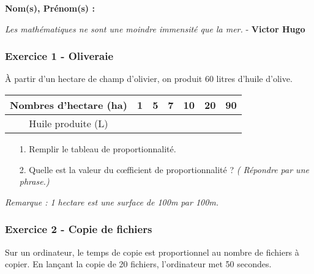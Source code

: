 \documentclass[12pt]{article}
\begin{document}

\textbf{Nom(s), Prénom(s) :}

\begin{center}
\textit{Les mathématiques ne sont une moindre immensité que la mer.} - \textbf{Victor Hugo}
\end{center}

\subsubsection*{Exercice 1 - Oliveraie}

À partir d'un hectare de champ d'olivier, on produit 60 litres d'huile d'olive. 

\begin{center}
  \begin{tabular}{| c ||           c | c | c |  c |  c |  c|}
    \hline
    Nombres d'hectare (ha)      &  1 & 5 & 7 & 10 & 20 & 90 \\
    \hline
    Huile produite (L) & \phantom{$\frac{aze}{aazertyui}$} & \phantom{$\frac{aze}{aazertyui}$} & \phantom{$\frac{aze}{aazertyui}$} & \phantom{$\frac{aze}{aazertyui}$} &  \phantom{$\frac{aze}{aazertyui}$} & \phantom{$\frac{aze}{aazertyui}$} \\ 
    \hline
  \end{tabular}
\end{center}


\begin{enumerate}
\item[1.] Remplir le tableau de proportionnalité. 
\item[2.] Quelle est la valeur du cœfficient de proportionnalité ? \textit{( Répondre par une phrase.)}
\vspace{1cm}
\end{enumerate}

\textit{Remarque : 1 hectare est une surface de 100m par 100m.}

\subsubsection*{Exercice 2 - Copie de fichiers}

Sur un ordinateur, le temps de copie est proportionnel au nombre de fichiers à copier. En lançant la copie de 20 fichiers, l'ordinateur met 50 secondes. 
\end{document}
